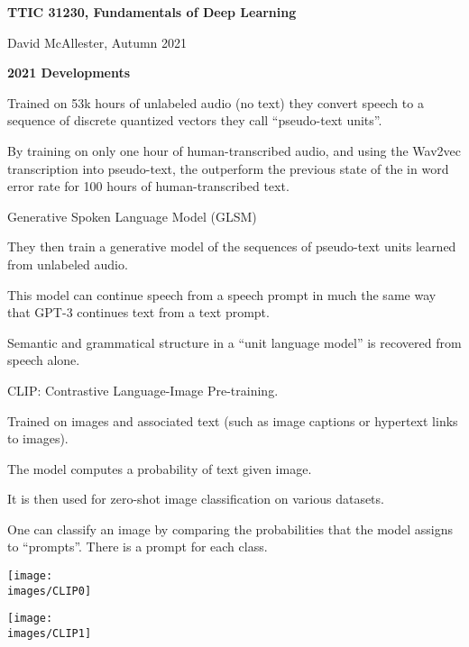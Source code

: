 




{\Huge
  \centerline{\bf TTIC 31230,  Fundamentals of Deep Learning}
  \vfill
  \centerline{David McAllester, Autumn 2021}
  \vfill
  \centerline{\bf 2021 Developments}

\vfill
\vfill


\vfill
Trained on 53k hours of unlabeled audio (no text) they convert speech to a sequence of discrete quantized vectors they call ``pseudo-text units''.

\vfill
By training on only one hour of human-transcribed audio, and using the Wav2vec transcription into pseudo-text, the outperform the previous state of the
in word error rate for 100 hours of human-transcribed text.



Generative Spoken Language Model (GLSM)



\vfill
They then train a generative model of the sequences of pseudo-text units learned from unlabeled audio.


\vfill
This model can continue speech from a speech prompt in much the same way that GPT-3 continues text from a text prompt.

\vfill
Semantic and grammatical structure in a ``unit language model'' is recovered
from speech alone.



CLIP: Contrastive Language-Image Pre-training.

\vfill
Trained on images and associated text (such as image captions or hypertext links to images).

\vfill
The model computes a probability of text given image.

\vfill
It is then used for zero-shot image classification on various datasets.

\vfill
One can classify an image by comparing the probabilities that the model assigns to ``prompts''.  There is a prompt for each class.


\centerline{\texttt{[image: \\images/CLIP0]}}


\centerline{\texttt{[image: \\images/CLIP1]}}

}
